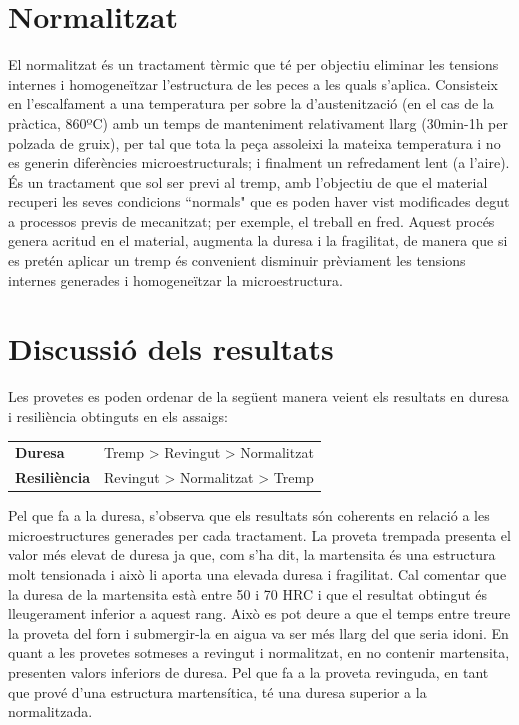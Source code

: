 \documentclass[a4paper]{report}
\begin{document}
\section{Normalitzat}
El normalitzat és un tractament tèrmic que té per objectiu eliminar les tensions internes i homogeneïtzar l'estructura de les peces a les quals s'aplica. Consisteix en l'escalfament a una temperatura per sobre la d'austenització (en el cas de la pràctica, 860ºC) amb un temps de manteniment relativament llarg (30min-1h per polzada de gruix),  per tal que tota la peça assoleixi la mateixa temperatura i no es generin diferències microestructurals; i finalment un refredament lent (a l'aire). És un tractament que sol ser previ al tremp, amb l'objectiu de que el material recuperi les seves condicions ``normals" que es poden haver vist modificades degut a processos previs de mecanitzat; per exemple, el treball en fred. Aquest procés genera acritud en el material, augmenta la duresa i la fragilitat, de manera que si es pretén aplicar un tremp és convenient disminuir prèviament les tensions internes generades i homogeneïtzar la microestructura. 

\section{Discussió dels resultats}
Les provetes es poden ordenar de la següent manera veient els resultats en duresa i resiliència obtinguts en els assaigs:

\begin{table}[H]
	\centering
	\begin{tabular}{lr}
		\textbf{Duresa} & Tremp > Revingut > Normalitzat \\
		\textbf{Resiliència} & Revingut > Normalitzat > Tremp
	\end{tabular}
\end{table}

Pel que fa a la duresa, s'observa que els resultats són coherents en relació a les microestructures generades per cada tractament. La proveta trempada presenta el valor més elevat de duresa ja que, com s'ha dit, la martensita és una estructura molt tensionada i això li aporta una elevada duresa i fragilitat. Cal comentar que la duresa de la martensita està entre 50 i 70 HRC i que el resultat obtingut és lleugerament inferior a aquest rang. Això es pot deure a que el temps entre treure la proveta del forn i submergir-la en aigua va ser més llarg del que seria idoni. En quant a les provetes sotmeses a revingut i normalitzat, en no contenir martensita, presenten valors inferiors de duresa. Pel que fa a la proveta revinguda, en tant que prové d'una estructura martensítica, té una duresa superior a la normalitzada.
\end{document}
